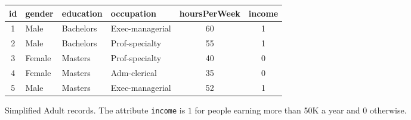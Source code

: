 \begin{figure}[t]
\centering
\footnotesize 
\begin{tabular}{@{}clllcc@{}}
\toprule
id & gender & education & occupation & hoursPerWeek & income \\
\midrule
1 & Male   & Bachelors & Exec-managerial & 60 & 1 \\
2 & Male   & Bachelors & Prof-specialty  & 55 & 1 \\
3 & Female & Masters   & Prof-specialty  & 40 & 0 \\
4 & Female & Masters   & Adm-clerical    & 35 & 0 \\
5 & Male   & Masters   & Exec-managerial & 52 & 1 \\
\bottomrule
\end{tabular}
\caption{Simplified Adult records. The attribute
\texttt{income} is $1$ for people earning more than 50K a year and $0$
otherwise.}
\label{fig:intro-records}
\end{figure}

